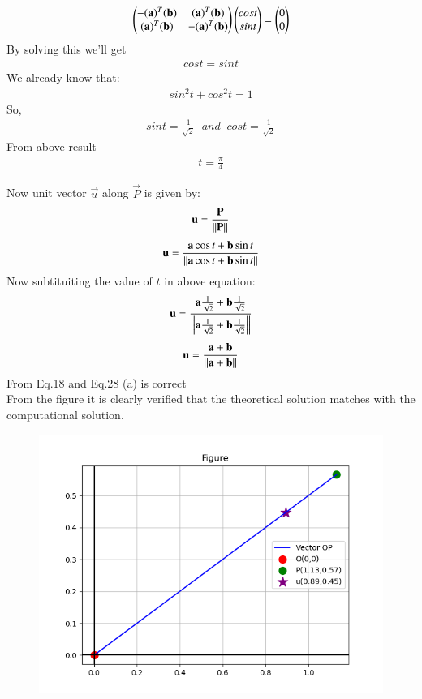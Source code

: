 \documentclass[journal]{IEEEtran}
\theoremstyle{remark}
\begin{document}
\begin{align}
    \myvec{-(\Vec{a})^T(\Vec{b})&(\Vec{a})^T(\Vec{b})\\(\Vec{a})^T(\Vec{b})&-(\Vec{a})^T(\Vec{b})}\myvec{cost\\sint}=\myvec{0\\0}
\end{align}
By solving this we'll get 
\begin{align}
    cost=sint
\end{align}
We already know that:
\begin{align}
    sin^2t+cos^2t=1
\end{align}
So,
\begin{align}
    sint=\frac{1}{\sqrt{2}}\;\;and\;\; cost=\frac{1}{\sqrt{2}}
\end{align}
From above result
\begin{align}
    t=\frac{\pi}{4}
\end{align}

Now unit vector $\Vec{u}$ along $\Vec{P}$ is given by:
\begin{align}
    \Vec{{\Vec{u}}}=\frac{\Vec{P}}{\norm{\Vec{P}}}
\end{align}
\begin{align}
\Vec{\Vec{u}}=\frac{\vec{a}\cos{t} + \vec{b}\sin{t}}{\norm{\vec{a}\cos{t} + \vec{b}\sin{t}}}
\end{align}
Now subtituiting the value of $t$ in above equation:
\begin{align}
    \Vec{u}=\frac{\Vec{a}\frac{1}{\sqrt{2}} + \Vec{b}\frac{1}{\sqrt{2}}}{\norm{\Vec{a}\frac{1}{\sqrt{2}} + \Vec{b}\frac{1}{\sqrt{2}}}}
\end{align}
\begin{align}
    \Vec{u}=\frac{\Vec{a} + \Vec{b}}{\norm{\Vec{a} + \Vec{b}}}
\end{align}
From Eq.18 and Eq.28 (a) is correct\\
From the figure it is clearly verified that the theoretical solution matches with the computational solution.\\
\begin{figure}[h]
    \centering
    \includegraphics[height=0.5\textheight, keepaspectratio]{figs/figure1.png}
    \label{figure_1}
\end{figure}
\end{document}
